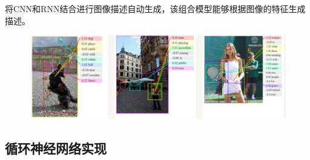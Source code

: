 \documentclass[openbib]{article}
\begin{document}
将CNN和RNN结合进行图像描述自动生成，该组合模型能够根据图像的特征生成描述。

\begin{figure}[H]
	\centering
	\includegraphics[scale=0.3]{CNN和RNN结合自动生成图片描述}
\end{figure}

\subsection{循环神经网络实现}
\end{document}
